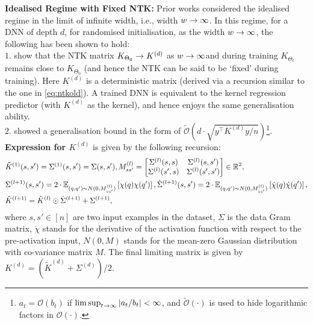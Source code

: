 \textbf{Idealised Regime with Fixed NTK:}
Prior works considered the idealised regime in the limit of infinite width, i.e., width $w\rightarrow\infty$. In this regime, for a DNN of depth $d$, for randomised initialisation, as the width $w\rightarrow\infty$, the following has been shown to hold:\\
$1.$ \cite{arora2019exact} show that the NTK matrix $K_{\Theta_0}\rightarrow K^{(d)}$ as $w\rightarrow\infty$and during training $K_{\Theta_t}$ remains close to $K_{\Theta_0}$ (and hence the NTK can be said to be `fixed' during training). Here $K^{(d)}$ is a deterministic matrix (derived via a recursion similar to the one in \eqref{eq:ntkold}). A trained DNN is equivalent to the kernel regression predictor (with $K^{(d)}$ as the kernel), and hence enjoys the same generalisation ability.\\
$2.$  \cite{cao2019generalization} showed a generalisation bound in the form of $\tilde{\mathcal{O}}\left(d\cdot\sqrt{y^\top K^{(d)} y/n}\right)$\footnote{$a_t=\mathcal{O}(b_t)$ if $\lim\sup_{t\rightarrow\infty}|a_t/b_t|<\infty$, and $\tilde{\mathcal{O}}(\cdot)$ is used to hide logarithmic factors in $\mathcal{O}(\cdot)$.}.\\
\textbf{Expression for $K^{(d)}$} is given by the following recursion: 
\begin{align}\label{eq:ntkold}
&\tilde{K}^{(1)}(s,s')=\Sigma^{(1)}(s,s')=\Sigma(s,s'), M^{(l)}_{ss'}=\left[\begin{matrix}\Sigma^{(l)}(s,s) & \Sigma^{(l)}(s,s')\\ \Sigma^{(l)}(s',s) & \Sigma^{(l)}(s',s')\end{matrix}\right]\in \mathbb{R}^2,\\
&\Sigma^{(l+1)}(s,s')= 2\cdot\mathbb{E}_{(q,q')\sim N(0,M_{ss'}^{(l)})} \left[\chi(q)\chi(q')\right], \dot{\Sigma}^{(l+1)}(s,s')= 2\cdot\mathbb{E}_{(q,q')\sim N(0,M_{ss'}^{(l)})}\left[\dot{\chi}(q)\dot{\chi}(q')\right],\nonumber\\
&\tilde{K}^{(l+1)}=\tilde{K}^{(l)}\odot \dot{\Sigma}^{(l+1)}+\Sigma^{(l+1)},\nonumber
\end{align}
where $s,s'\in[n]$ are two input examples in the dataset, $\Sigma$ is the data Gram matrix, $\dot{\chi}$ stands for the derivative of the activation function with respect to the pre-activation input, $N(0,M)$ stands for the mean-zero Gaussian distribution with co-variance matrix $M$. The final limiting matrix is given by $K^{(d)}=\left(\tilde{K}^{(d)}+\Sigma^{(d)}\right)/2$. 

